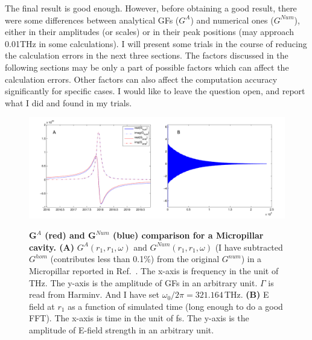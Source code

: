 The final result is good enough. However, before obtaining a good result, there were some differences between analytical GFs ($G^{A}$) and numerical ones ($G^{Num}$), either in their amplitudes (or scales) or in their peak positions (may approach 0.01THz in some calculations). I will present some trials in the course of reducing the calculation errors in the next three sections. The factors discussed in the following sections may be only a part of possible factors which can affect the calculation errors. Other factors can also affect the computation accuracy significantly for specific cases. I would like to leave the question open, and report what I did and found in my trials.

\begin{figure}[H]
\centering
\begin{center}
{\includegraphics[width=16cm]{./Figs/Gmp30_combine}}
\end{center}
\caption[GF for a micropillar laser.]{\textbf{  $\mathbf{G}^{A}$ (red) and $\mathbf{G}^{Num}$ (blue) comparison for a Micropillar cavity. (A)} $G^{A}(r_1,r_1,\omega)$ and $G^{Num}(r_1,r_1,\omega)$ (I have subtracted $G^{hom}$ (contributes less than 0.1\%) from the original $G^{num}$) in a Micropillar reported in Ref.~\cite{Reitzenstein2007}. The x-axis is frequency in the unit of THz. The y-axis is the amplitude of GFs in an arbitrary unit. $\Gamma$ is read from Harminv. And I have set $\omega_0/2\pi=321.164\,$THz. \textbf{(B)} E field at $r_1$ as a function of simulated time (long enough to do a good FFT). The x-axis is time in the unit of fs. The y-axis is the amplitude of E-field strength in an arbitrary unit.}
\label{Gmp30_combine}
\end{figure}

